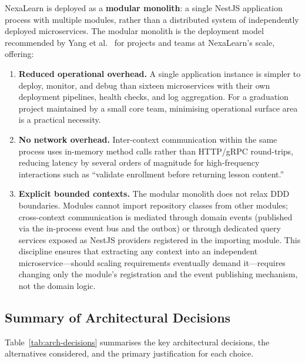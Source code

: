 NexaLearn is deployed as a \textbf{modular monolith}: a single NestJS application process with multiple modules, rather than a distributed system of independently deployed microservices. The modular monolith is the deployment model recommended by Yang et al.~\cite{yang2023micro} for projects and teams at NexaLearn's scale, offering:

\begin{enumerate}
  \item \textbf{Reduced operational overhead.} A single application instance is simpler to deploy, monitor, and debug than sixteen microservices with their own deployment pipelines, health checks, and log aggregation. For a graduation project maintained by a small core team, minimising operational surface area is a practical necessity.
  \item \textbf{No network overhead.} Inter-context communication within the same process uses in-memory method calls rather than HTTP/gRPC round-trips, reducing latency by several orders of magnitude for high-frequency interactions such as ``validate enrollment before returning lesson content.''
  \item \textbf{Explicit bounded contexts.} The modular monolith does not relax DDD boundaries. Modules cannot import repository classes from other modules; cross-context communication is mediated through domain events (published via the in-process event bus and the outbox) or through dedicated query services exposed as NestJS providers registered in the importing module. This discipline ensures that extracting any context into an independent microservice---should scaling requirements eventually demand it---requires changing only the module's registration and the event publishing mechanism, not the domain logic.
\end{enumerate}

\subsection{Summary of Architectural Decisions}

Table~\ref{tab:arch-decisions} summarises the key architectural decisions, the alternatives considered, and the primary justification for each choice.

